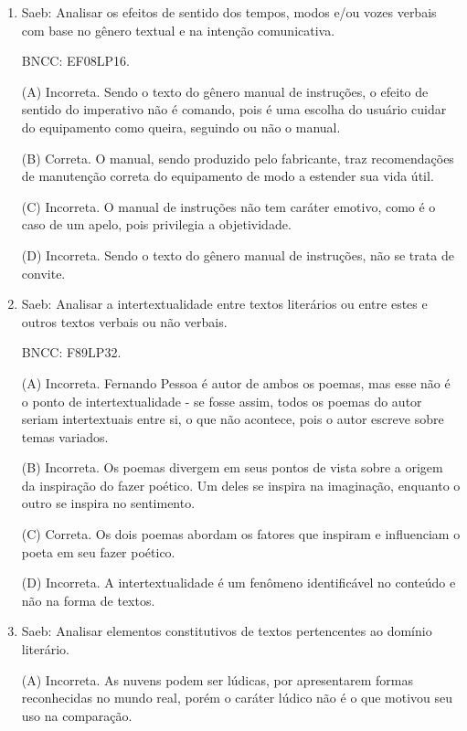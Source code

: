 \begin{enumerate}
(D) Incorreta. Os jogadores de linha não são exaltados, eles são citados
para fins de comparação do quanto um goleiro precisa fazer para ser
reconhecido ou para recuperar esse reconhecimento perante a torcida.


\item

Saeb: Analisar os efeitos de sentido dos tempos, modos e/ou vozes
verbais com base no gênero textual e na intenção comunicativa.

BNCC: EF08LP16.

(A) Incorreta. Sendo o texto do gênero manual de instruções, o efeito de
sentido do imperativo não é comando, pois é uma escolha do usuário
cuidar do equipamento como queira, seguindo ou não o manual.

(B) Correta. O manual, sendo produzido pelo fabricante, traz
recomendações de manutenção correta do equipamento de modo a estender
sua vida útil.

(C) Incorreta. O manual de instruções não tem caráter emotivo, como é o
caso de um apelo, pois privilegia a objetividade.

(D) Incorreta. Sendo o texto do gênero manual de instruções, não se
trata de convite.


\item


Saeb: Analisar a intertextualidade entre textos literários ou entre
estes e outros textos verbais ou não verbais.

BNCC: F89LP32.

(A) Incorreta. Fernando Pessoa é autor de ambos os poemas, mas esse não
é o ponto de intertextualidade - se fosse assim, todos os poemas do autor
seriam intertextuais entre si, o que não acontece, pois o autor escreve
sobre temas variados.

(B) Incorreta. Os poemas divergem em seus pontos de vista sobre a origem
da inspiração do fazer poético. Um deles se inspira na imaginação,
enquanto o outro se inspira no sentimento.

(C) Correta. Os dois poemas abordam os fatores que inspiram e
influenciam o poeta em seu fazer poético.

(D) Incorreta. A intertextualidade é um fenômeno identificável no
conteúdo e não na forma de textos.

\item

Saeb: Analisar elementos constitutivos de textos pertencentes ao domínio
literário.

(A) Incorreta. As nuvens podem ser lúdicas, por apresentarem formas
reconhecidas no mundo real, porém o caráter lúdico não é o que motivou
seu uso na comparação.


\end{enumerate}

